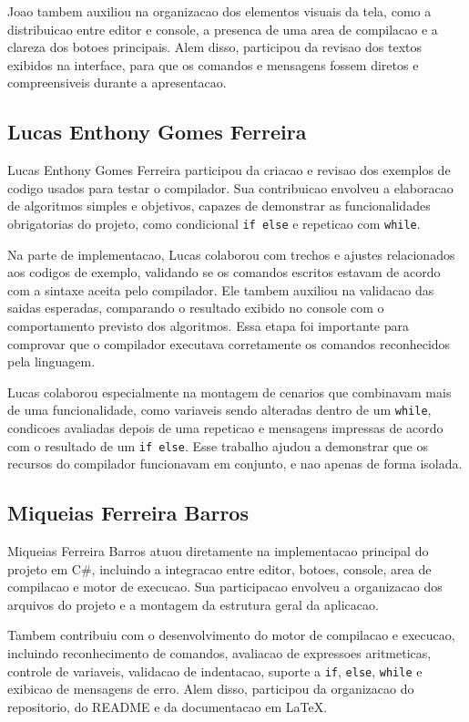 \documentclass[12pt,a4paper]{article}
\begin{document}
Joao tambem auxiliou na organizacao dos elementos visuais da tela, como a distribuicao entre editor e console, a presenca de uma area de compilacao e a clareza dos botoes principais. Alem disso, participou da revisao dos textos exibidos na interface, para que os comandos e mensagens fossem diretos e compreensiveis durante a apresentacao.

\subsection*{Lucas Enthony Gomes Ferreira}

Lucas Enthony Gomes Ferreira participou da criacao e revisao dos exemplos de codigo usados para testar o compilador. Sua contribuicao envolveu a elaboracao de algoritmos simples e objetivos, capazes de demonstrar as funcionalidades obrigatorias do projeto, como condicional \texttt{if else} e repeticao com \texttt{while}.

Na parte de implementacao, Lucas colaborou com trechos e ajustes relacionados aos codigos de exemplo, validando se os comandos escritos estavam de acordo com a sintaxe aceita pelo compilador. Ele tambem auxiliou na validacao das saidas esperadas, comparando o resultado exibido no console com o comportamento previsto dos algoritmos. Essa etapa foi importante para comprovar que o compilador executava corretamente os comandos reconhecidos pela linguagem.

Lucas colaborou especialmente na montagem de cenarios que combinavam mais de uma funcionalidade, como variaveis sendo alteradas dentro de um \texttt{while}, condicoes avaliadas depois de uma repeticao e mensagens impressas de acordo com o resultado de um \texttt{if else}. Esse trabalho ajudou a demonstrar que os recursos do compilador funcionavam em conjunto, e nao apenas de forma isolada.

\subsection*{Miqueias Ferreira Barros}

Miqueias Ferreira Barros atuou diretamente na implementacao principal do projeto em C\#, incluindo a integracao entre editor, botoes, console, area de compilacao e motor de execucao. Sua participacao envolveu a organizacao dos arquivos do projeto e a montagem da estrutura geral da aplicacao.

Tambem contribuiu com o desenvolvimento do motor de compilacao e execucao, incluindo reconhecimento de comandos, avaliacao de expressoes aritmeticas, controle de variaveis, validacao de indentacao, suporte a \texttt{if}, \texttt{else}, \texttt{while} e exibicao de mensagens de erro. Alem disso, participou da organizacao do repositorio, do README e da documentacao em LaTeX.
\end{document}
